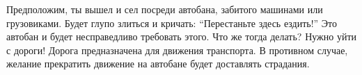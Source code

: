 Предположим, ты вышел и сел посреди автобана, забитого машинами или грузовиками. Будет глупо злиться и кричать: “Перестаньте здесь ездить!” Это автобан и будет несправедливо требовать этого. Что же тогда делать? Нужно уйти с дороги! Дорога предназначена для движения транспорта. В противном случае, желание прекратить движение на автобане будет доставлять страдания.


